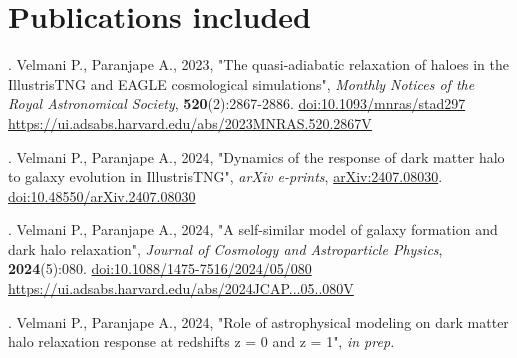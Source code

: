 \documentclass[a4paper, 12pt, oneside]{Thesis}  %
\newcommand{\doi}[1]{\href{https://doi.org/#1}{doi:#1}}
\begin{document}
\section*{Publications included}

. Velmani P., Paranjape A., 2023, "The quasi-adiabatic relaxation of haloes in the IllustrisTNG and EAGLE cosmological simulations", \textit{Monthly Notices of the Royal Astronomical Society}, 
\textbf{520}(2):2867-2886. 
\doi{10.1093/mnras/stad297}
\href{https://ui.adsabs.harvard.edu/abs/2023MNRAS.520.2867V}{https://ui.adsabs.harvard.edu/abs/2023MNRAS.520.2867V}

\vspace{0.5cm}

. Velmani P., Paranjape A., 2024, "Dynamics of the response of dark matter halo to galaxy evolution in IllustrisTNG", \textit{arXiv e-prints}, 
\href{https://ui.adsabs.harvard.edu/abs/2024arXiv240708030V}{arXiv:2407.08030}. 
\doi{10.48550/arXiv.2407.08030}

\vspace{0.5cm}

. Velmani P., Paranjape A., 2024, "A self-similar model of galaxy formation and dark halo relaxation", \textit{Journal of Cosmology and Astroparticle Physics}, 
\textbf{2024}(5):080. 
\doi{10.1088/1475-7516/2024/05/080}
\href{https://ui.adsabs.harvard.edu/abs/2024JCAP...05..080V}{https://ui.adsabs.harvard.edu/abs/2024JCAP...05..080V}

\vspace{0.5cm}

. Velmani P., Paranjape A., 2024, "Role of astrophysical modeling on dark matter halo relaxation response at redshifts z = 0 and z = 1", \textit{in prep.}







\end{document}
